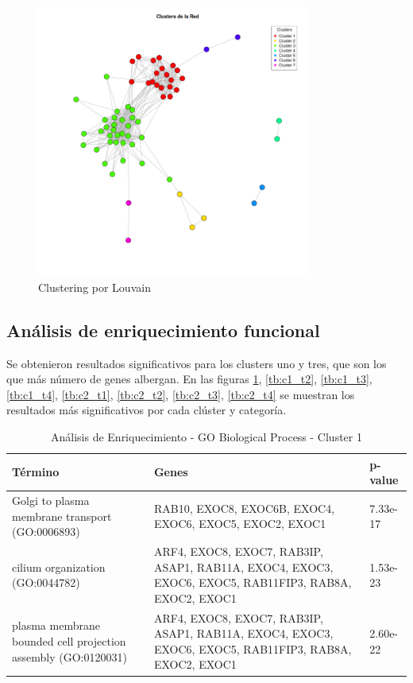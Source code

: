 \begin{figure}[h!]
	\includegraphics[width=0.8\textwidth]{figures/network_clusters_colored.png}
	\caption{Clustering por Louvain}
	\label{fig:Clustering}
\end{figure}



\subsection{Análisis de enriquecimiento funcional}

Se obtenieron resultados significativos para los clusters uno y tres, que son los que más número de genes albergan. En las figuras \ref{tb:c1_t1}, \ref{tb:c1_t2}, \ref{tb:c1_t3}, \ref{tb:c1_t4}, \ref{tb:c2_t1}, \ref{tb:c2_t2}, \ref{tb:c2_t3}, \ref{tb:c2_t4} se muestran los resultados más significativos por cada clúster y categoría.
\begin{table}[H]
	\centering
	\caption{Análisis de Enriquecimiento - GO Biological Process - Cluster 1}
	\label{tb:c1_t1}
	\begin{tabular}{|p{4cm}|p{4cm}|p{3cm}|}
		\hline
		\textbf{Término} & \textbf{Genes} & \textbf{p-value} \\ \hline
		Golgi to plasma membrane transport (GO:0006893) & RAB10, EXOC8, EXOC6B, EXOC4, EXOC6, EXOC5, EXOC2, EXOC1 & 7.33e-17 \\ \hline
		cilium organization (GO:0044782) & ARF4, EXOC8, EXOC7, RAB3IP, ASAP1, RAB11A, EXOC4, EXOC3, EXOC6, EXOC5, RAB11FIP3, RAB8A, EXOC2, EXOC1 & 1.53e-23 \\ \hline
		plasma membrane bounded cell projection assembly (GO:0120031) & ARF4, EXOC8, EXOC7, RAB3IP, ASAP1, RAB11A, EXOC4, EXOC3, EXOC6, EXOC5, RAB11FIP3, RAB8A, EXOC2, EXOC1 & 2.60e-22 \\ \hline
	\end{tabular}
\end{table}

